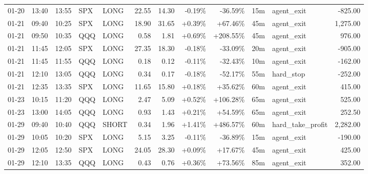 \documentclass[11pt,a4paper,twoside]{article}
\begin{document}
\begin{center}
\begin{longtable}{>{\color{txtmain}}l l l l l r r r r r >{\color{txtmain}}l r}
01-20 & 13:40 & 13:55 & SPX & LONG & 22.55 & 14.30 & \textcolor{lossred}{-0.19\%} & \textcolor{lossred}{-36.59\%} & 15m & agent\_exit & \textcolor{lossred}{-825.00} \\
01-21 & 09:40 & 10:25 & SPX & LONG & 18.90 & 31.65 & \textcolor{wingreen}{+0.39\%} & \textcolor{wingreen}{+67.46\%} & 45m & agent\_exit & \textcolor{wingreen}{1,275.00} \\
01-21 & 09:50 & 10:35 & QQQ & LONG & 0.58 & 1.81 & \textcolor{wingreen}{+0.69\%} & \textcolor{wingreen}{+208.55\%} & 45m & agent\_exit & \textcolor{wingreen}{976.00} \\
01-21 & 11:45 & 12:05 & SPX & LONG & 27.35 & 18.30 & \textcolor{lossred}{-0.18\%} & \textcolor{lossred}{-33.09\%} & 20m & agent\_exit & \textcolor{lossred}{-905.00} \\
01-21 & 11:45 & 11:55 & QQQ & LONG & 0.18 & 0.12 & \textcolor{lossred}{-0.11\%} & \textcolor{lossred}{-32.43\%} & 10m & agent\_exit & \textcolor{lossred}{-162.00} \\
01-21 & 12:10 & 13:05 & QQQ & LONG & 0.34 & 0.17 & \textcolor{lossred}{-0.18\%} & \textcolor{lossred}{-52.17\%} & 55m & hard\_stop & \textcolor{lossred}{-252.00} \\
01-21 & 12:35 & 13:35 & SPX & LONG & 11.65 & 15.80 & \textcolor{wingreen}{+0.18\%} & \textcolor{wingreen}{+35.62\%} & 60m & agent\_exit & \textcolor{wingreen}{415.00} \\
01-23 & 10:15 & 11:20 & QQQ & LONG & 2.47 & 5.09 & \textcolor{wingreen}{+0.52\%} & \textcolor{wingreen}{+106.28\%} & 65m & agent\_exit & \textcolor{wingreen}{525.00} \\
01-23 & 13:00 & 14:05 & QQQ & LONG & 0.93 & 1.43 & \textcolor{wingreen}{+0.21\%} & \textcolor{wingreen}{+54.59\%} & 65m & agent\_exit & \textcolor{wingreen}{252.50} \\
01-29 & 09:40 & 10:40 & QQQ & SHORT & 0.34 & 1.96 & \textcolor{wingreen}{+1.41\%} & \textcolor{wingreen}{+486.57\%} & 60m & hard\_take\_profit & \textcolor{wingreen}{2,282.00} \\
01-29 & 10:05 & 10:20 & SPX & LONG & 5.15 & 3.25 & \textcolor{lossred}{-0.11\%} & \textcolor{lossred}{-36.89\%} & 15m & agent\_exit & \textcolor{lossred}{-190.00} \\
01-29 & 12:05 & 12:50 & SPX & LONG & 24.05 & 28.30 & \textcolor{wingreen}{+0.09\%} & \textcolor{wingreen}{+17.67\%} & 45m & agent\_exit & \textcolor{wingreen}{425.00} \\
01-29 & 12:10 & 13:35 & QQQ & LONG & 0.43 & 0.76 & \textcolor{wingreen}{+0.36\%} & \textcolor{wingreen}{+73.56\%} & 85m & agent\_exit & \textcolor{wingreen}{352.00} \\

\end{longtable}
\end{center}
\end{document}
